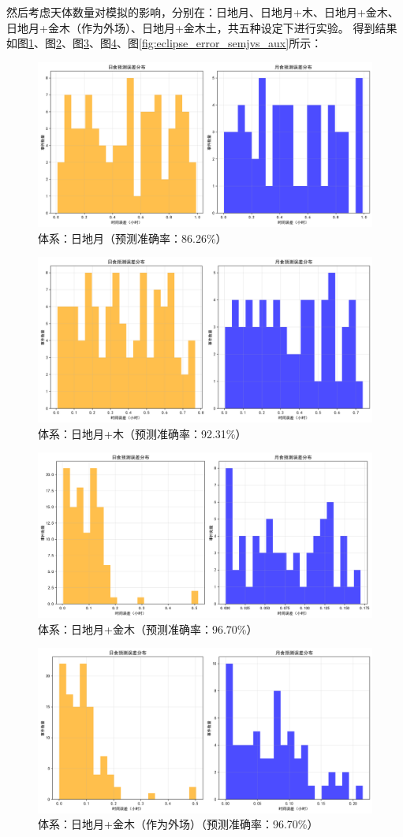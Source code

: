 \documentclass[hidelinks]{article}
\begin{document}
然后考虑天体数量对模拟的影响，分别在：日地月、日地月+木、日地月+金木、日地月+金木（作为外场）、日地月+金木土，共五种设定下进行实验。
得到结果如图\ref{fig:eclipse_error_sem}、图\ref{fig:eclipse_error_semj}、图\ref{fig:eclipse_error_semjv}、图\ref{fig:eclipse_error_semjv_aux}、图\ref{fig:eclipse_error_semjvs_aux}所示：
\begin{figure}[h]
    \centering
    \includegraphics[width=0.5\linewidth]{images/error_distribution_sem.png}
    \caption{体系：日地月（预测准确率：86.26\%）}
    \label{fig:eclipse_error_sem}
\end{figure}

\begin{figure}[h]
    \centering
    \includegraphics[width=0.5\linewidth]{images/error_distribution_semj.png}
    \caption{体系：日地月+木（预测准确率：92.31\%）}
    \label{fig:eclipse_error_semj}
\end{figure}

\begin{figure}[h]
    \centering
    \includegraphics[width=0.5\linewidth]{images/error_distribution_1.png}
    \caption{体系：日地月+金木（预测准确率：96.70\%）}
    \label{fig:eclipse_error_semjv}
\end{figure}

\begin{figure}[h]
    \centering
    \includegraphics[width=0.5\linewidth]{images/error_distribution_semjv_aux.png}
    \caption{体系：日地月+金木（作为外场）（预测准确率：96.70\%）}
    \label{fig:eclipse_error_semjv_aux}
\end{figure}
\end{document}
